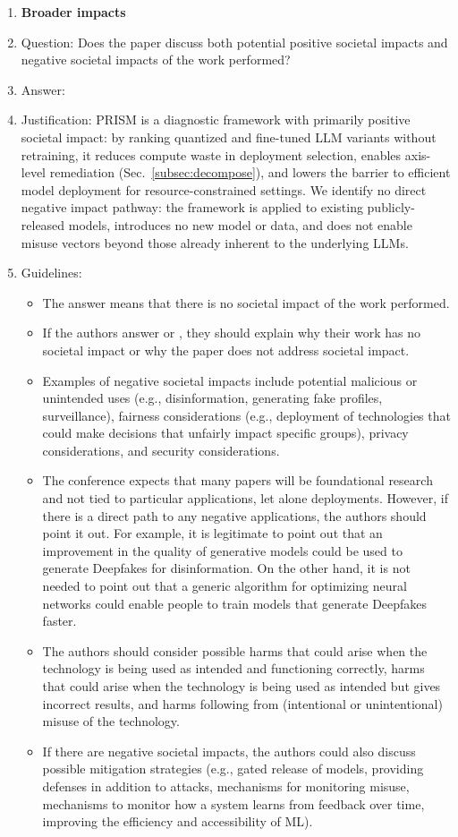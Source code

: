\begin{enumerate}
\item {\bf Broader impacts}
    \item[] Question: Does the paper discuss both potential positive societal impacts and negative societal impacts of the work performed?
    \item[] Answer: \answerYes{}
    \item[] Justification: PRISM is a diagnostic framework with primarily positive societal impact: by ranking quantized and fine-tuned LLM variants without retraining, it reduces compute waste in deployment selection, enables axis-level remediation (Sec.~\ref{subsec:decompose}), and lowers the barrier to efficient model deployment for resource-constrained settings. We identify no direct negative impact pathway: the framework is applied to existing publicly-released models, introduces no new model or data, and does not enable misuse vectors beyond those already inherent to the underlying LLMs.
    \item[] Guidelines:
    \begin{itemize}
        \item The answer \answerNA{} means that there is no societal impact of the work performed.
        \item If the authors answer \answerNA{} or \answerNo, they should explain why their work has no societal impact or why the paper does not address societal impact.
        \item Examples of negative societal impacts include potential malicious or unintended uses (e.g., disinformation, generating fake profiles, surveillance), fairness considerations (e.g., deployment of technologies that could make decisions that unfairly impact specific groups), privacy considerations, and security considerations.
        \item The conference expects that many papers will be foundational research and not tied to particular applications, let alone deployments. However, if there is a direct path to any negative applications, the authors should point it out. For example, it is legitimate to point out that an improvement in the quality of generative models could be used to generate Deepfakes for disinformation. On the other hand, it is not needed to point out that a generic algorithm for optimizing neural networks could enable people to train models that generate Deepfakes faster.
        \item The authors should consider possible harms that could arise when the technology is being used as intended and functioning correctly, harms that could arise when the technology is being used as intended but gives incorrect results, and harms following from (intentional or unintentional) misuse of the technology.
        \item If there are negative societal impacts, the authors could also discuss possible mitigation strategies (e.g., gated release of models, providing defenses in addition to attacks, mechanisms for monitoring misuse, mechanisms to monitor how a system learns from feedback over time, improving the efficiency and accessibility of ML).
    \end{itemize}


\end{enumerate}
